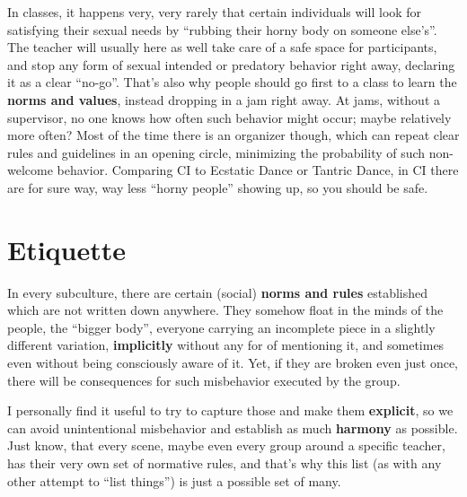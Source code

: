 In classes, it happens very, very rarely that certain individuals will look for satisfying their sexual needs by ``rubbing their horny body on someone else's''.
The teacher will usually here as well take care of a safe space for participants, and stop any form of sexual intended or predatory behavior right away, declaring it as a clear ``no-go''.
That's also why people should go first to a class to learn the \textbf{norms and values}, instead dropping in a jam right away.
At jams, without a supervisor, no one knows how often such behavior might occur; maybe relatively more often?
Most of the time there is an organizer though, which can repeat clear rules and guidelines in an opening circle, minimizing the probability of such non-welcome behavior.
Comparing CI to Ecstatic Dance or Tantric Dance, in CI there are for sure way, way less ``horny people'' showing up, so you should be safe.

\section{Etiquette}\label{sec:etiquette}

In every subculture, there are certain (social) \textbf{norms and rules} established which are not written down anywhere.
They somehow float in the minds of the people, the ``bigger body'', everyone carrying an incomplete piece in a slightly different variation, \textbf{implicitly} without any for of mentioning it, and sometimes even without being consciously aware of it.
Yet, if they are broken even just once, there will be consequences for such misbehavior executed by the group.

I personally find it useful to try to capture those and make them \textbf{explicit}, so we can avoid unintentional misbehavior and establish as much \textbf{harmony} as possible.
Just know, that every scene, maybe even every group around a specific teacher, has their very own set of normative rules, and that's why this list (as with any other attempt to ``list things'') is just a possible set of many.


